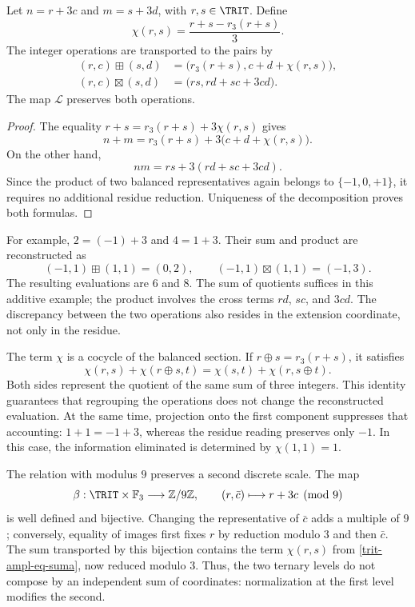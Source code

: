 \begin{proposition}
\label{trit-ampl-prop-aritmetica}
Let \(n=r+3c\) and \(m=s+3d\), with \(r,s\in\TRIT\). Define
\[
 \chi(r,s)=\frac{r+s-r_3(r+s)}3.
\]
The integer operations are transported to the pairs by
\begin{align}
 (r,c)\boxplus(s,d)
 &=\bigl(r_3(r+s),c+d+\chi(r,s)\bigr),
 \label{trit-ampl-eq-suma}\\
 (r,c)\boxtimes(s,d)
 &=\bigl(rs,rd+sc+3cd\bigr).
 \label{trit-ampl-eq-producto}
\end{align}
The map \(\mathcal L\) preserves both operations.
\end{proposition}
\begin{proof}
The equality \(r+s=r_3(r+s)+3\chi(r,s)\) gives
\[
 n+m=r_3(r+s)+3\bigl(c+d+\chi(r,s)\bigr).
\]
On the other hand,
\[
 nm=rs+3(rd+sc+3cd).
\]
Since the product of two balanced representatives again belongs to
\(\{-1,0,+1\}\), it requires no additional residue reduction. Uniqueness
of the decomposition proves both formulas.
\end{proof}

For example, \(2=(-1)+3\) and \(4=1+3\). Their sum and product are reconstructed
as
\[
 (-1,1)\boxplus(1,1)=(0,2),\qquad
 (-1,1)\boxtimes(1,1)=(-1,3).
\]
The resulting evaluations are \(6\) and \(8\). The sum of quotients suffices
in this additive example; the product involves the cross terms
\(rd\), \(sc\), and \(3cd\). The discrepancy between the two operations also resides
in the extension coordinate, not only in the residue.

The term \(\chi\) is a cocycle of the balanced section. If
\(r\oplus s=r_3(r+s)\), it satisfies
\[
 \chi(r,s)+\chi(r\oplus s,t)
 =\chi(s,t)+\chi(r,s\oplus t).
\]
Both sides represent the quotient of the same sum of three integers.
This identity guarantees that regrouping the operations does not change the
reconstructed evaluation. At the same time, projection onto the first
component suppresses that accounting: \(1+1=-1+3\), whereas the residue
reading preserves only \(-1\). In this case, the information eliminated is
determined by \(\chi(1,1)=1\).

The relation with modulus \(9\) preserves a second discrete scale.
The map
\[
 \beta:\TRIT\times\mathbb F_3\longrightarrow\mathbb Z/9\mathbb Z,
 \qquad (r,\bar c)\longmapsto r+3c\pmod9
\]
is well defined and bijective. Changing the representative of \(\bar c\)
adds a multiple of \(9\); conversely, equality of images first fixes
\(r\) by reduction modulo \(3\) and then \(\bar c\). The sum
transported by this bijection contains the term
\(\chi(r,s)\) from \eqref{trit-ampl-eq-suma}, now reduced modulo \(3\).
Thus, the two ternary levels do not compose by an independent sum
of coordinates: normalization at the first level modifies
the second.

